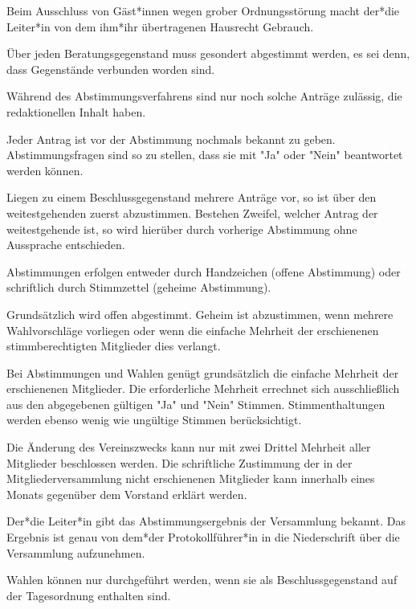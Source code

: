 \begin{gfmitglieder}
  Beim Ausschluss von Gäst*innen wegen grober Ordnungsstörung macht der*die Leiter*in von dem ihm*ihr übertragenen Hausrecht Gebrauch.


  Über jeden Beratungsgegenstand muss gesondert abgestimmt werden, es sei denn, dass Gegenstände verbunden worden sind.

  Während des Abstimmungsverfahrens sind nur noch solche Anträge zulässig, die redaktionellen Inhalt haben.

  Jeder Antrag ist vor der Abstimmung nochmals bekannt zu geben. Abstimmungsfragen sind so zu stellen, dass sie mit "Ja" oder "Nein" beantwortet werden können.

  Liegen zu einem Beschlussgegenstand mehrere Anträge vor, so ist über den weitestgehenden zuerst abzustimmen. Bestehen Zweifel, welcher Antrag der weitestgehende ist, so wird hierüber durch vorherige Abstimmung ohne Aussprache entschieden.


  Abstimmungen erfolgen entweder durch Handzeichen (offene Abstimmung) oder schriftlich durch Stimmzettel (geheime Abstimmung).

  Grundsätzlich wird offen abgestimmt. Geheim ist abzustimmen, wenn mehrere Wahlvorschläge vorliegen oder wenn die einfache Mehrheit der erschienenen stimmberechtigten Mitglieder dies verlangt.


  Bei Abstimmungen und Wahlen genügt grundsätzlich die einfache Mehrheit der erschienenen Mitglieder. Die erforderliche Mehrheit errechnet sich ausschlie\ss{}lich aus den abgegebenen gültigen "Ja" und "Nein" Stimmen. Stimmenthaltungen werden ebenso wenig wie ungültige Stimmen berücksichtigt.

  Die Änderung des Vereinszwecks kann nur mit zwei Drittel Mehrheit aller Mitglieder beschlossen werden. Die schriftliche Zustimmung der in der Mitgliederversammlung nicht erschienenen Mitglieder kann innerhalb eines Monats gegenüber dem Vorstand erklärt werden.

  Der*die Leiter*in gibt das Abstimmungsergebnis der Versammlung bekannt. Das Ergebnis ist genau von dem*der Protokollführer*in in die Niederschrift über die Versammlung aufzunehmen.


  Wahlen können nur durchgeführt werden, wenn sie als Beschlussgegenstand auf der Tagesordnung enthalten sind.


\end{gfmitglieder}
